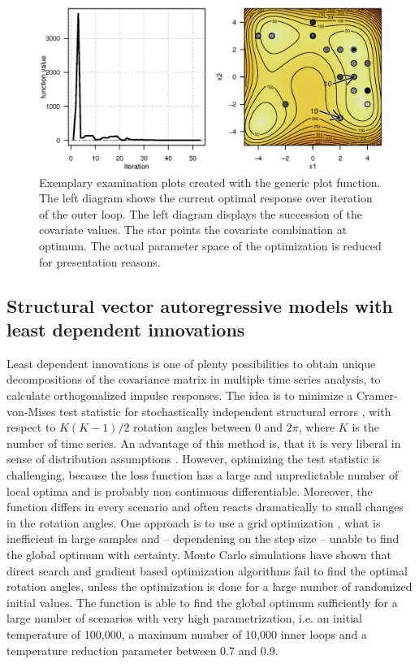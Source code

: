 \begin{figure}[htbp]
\centering
\includegraphics[width=1.025\textwidth]{Fig/fig2-ex2-plot.eps}
\caption{Exemplary examination plots created with the generic plot function. The left diagram shows the current optimal response over iteration of the outer loop. The left diagram displays the succession of the covariate values. The star points the covariate combination at optimum. The actual parameter space of the optimization is reduced for presentation reasons.}
\label{fig:fig2}
\end{figure}

\subsection{Structural vector autoregressive models with least dependent innovations}
Least dependent innovations is one of plenty possibilities to obtain unique decompositions of the covariance matrix in multiple time series analysis, to calculate orthogonalized impulse responses. The idea is to minimize a Cramer-von-Mises test statistic for stochastically independent structural errors \citep{genest_2007}, with respect to $K(K-1)/2$ rotation angles between $0$ and $2\pi$, where $K$ is the number of time series. An advantage of this method is, that it is very liberal in sense of distribution assumptions \citep{herwartz_2014}. However, optimizing the test statistic is challenging, because the loss function has a large and unpredictable number of local optima and is probably non continuous differentiable. Moreover, the function differs in every scenario and often reacts dramatically to small changes in the rotation angles. One approach is to use a grid optimization \citep{herwartz_2015}, what is inefficient in large samples and -- dependening on the step size -- unable to find the global optimum with certainty. Monte Carlo simulations have shown that direct search and gradient based optimization algorithms fail to find the optimal rotation angles, unless the optimization is done for a large number of randomized initial values. The  function is able to find the global optimum sufficiently for a large number of scenarios with very high parametrization, i.e. an initial temperature of 100,000, a maximum number of 10,000 inner loops and a temperature reduction parameter between 0.7 and 0.9.

